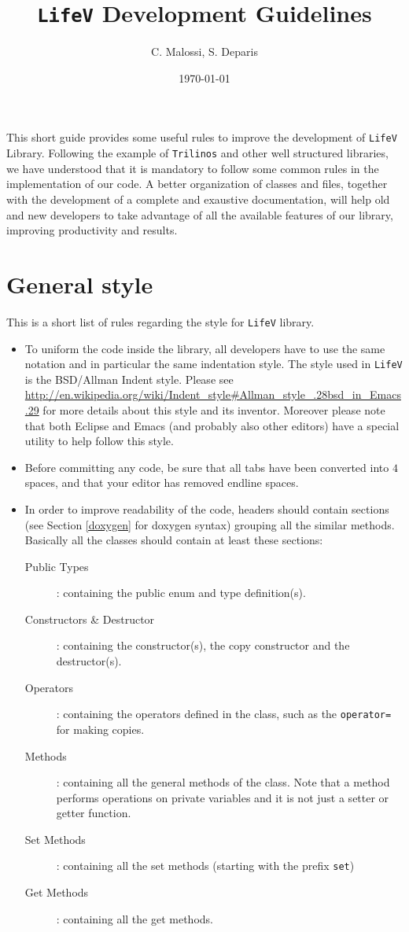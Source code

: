 \documentclass[a4paper]{article}
\title{\texttt{LifeV} Development Guidelines}
\author{C. Malossi, S. Deparis}
\date{\today}
\begin{document}
\maketitle

This short guide provides some useful rules to improve the
development of \texttt{LifeV} Library. Following the example of
\texttt{Trilinos} and other well structured libraries, we have understood that
it is mandatory to follow some common rules in the implementation of our code. 
A better organization of classes and files, together with the development of a
complete and exaustive documentation, will help old and new developers to
take advantage of all the available features of our library, improving
productivity and results.

\section{General style}
This is a short list of rules regarding the style for \texttt{LifeV}
library.  
\begin{itemize}
  \item To uniform the code inside the library, all developers have to
  use the same notation and in particular the same indentation style. The style
  used in \texttt{LifeV} is the BSD/Allman Indent style. Please see
  \url{http://en.wikipedia.org/wiki/Indent_style#Allman_style_.28bsd_in_Emacs.29} 
  for more details about this style and its inventor.
  Moreover please note that both Eclipse and Emacs (and probably also other editors)
  have a special utility to help follow this style.
  \item Before committing any code, be sure that all tabs have been converted
  into $4$ spaces, and that your editor has removed endline spaces.
  \item In order to improve readability of the code, headers should
  contain sections (see Section \ref{doxygen} for doxygen syntax) grouping
  all the similar methods. Basically all the classes should contain at least
  these sections:
  \begin{description}
      \item[Public Types]: containing the public enum and type definition(s).
	  \item[Constructors \& Destructor]: containing the constructor(s), the
      copy constructor and the destructor(s).
      \item[Operators]: containing the operators defined in the class, such as
      the \texttt{operator=} for making copies.
      \item[Methods]: containing all the general methods of the class. Note that
      a method performs operations on private variables and it is
      not just a setter or getter function.
      \item[Set Methods]: containing all the set methods (starting with the
      prefix \texttt{set})
      \item[Get Methods]: containing all the get methods.
  \end{description}
\end{itemize}
\end{document}
